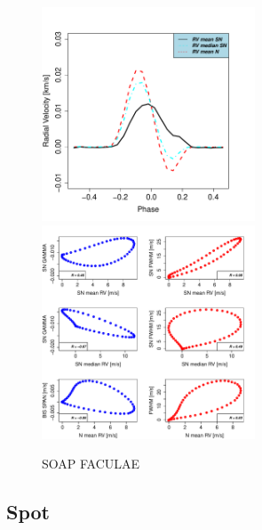 \documentclass[11pt, oneside]{article}
\begin{document}
\begin{figure}[htbp]
   \centering
\includegraphics[height = 2.5in]{RV_comparison_FACULAE.pdf} 
\includegraphics[height = 2.5in]{SOAP_FACULAE_Comparison_para_SN.pdf} 
   \caption{SOAP FACULAE}
    \label{fig:faculae}
\end{figure}

\subsection{Spot} \label{sec:soap.spot}
\end{document}
